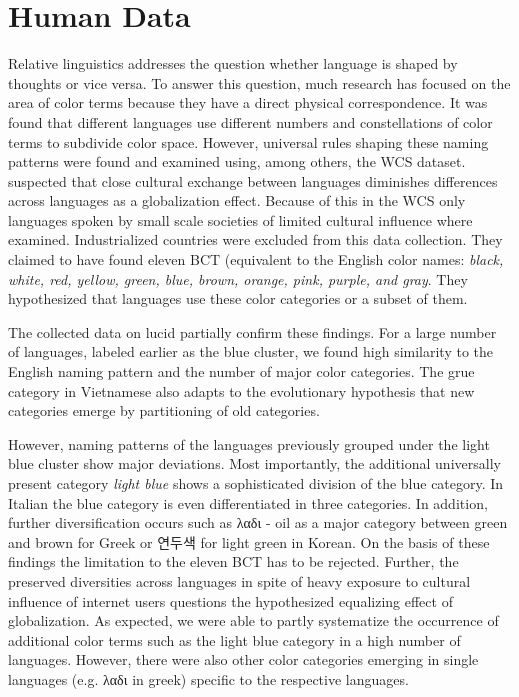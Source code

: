\section{Human Data}
Relative linguistics addresses the question whether language is shaped by thoughts or vice versa. To answer this question, much research has focused on the area of color terms because they have a direct physical correspondence. It was found that different languages use different numbers and constellations of color terms to subdivide color space. However, universal rules shaping these naming patterns were found and examined using, among others, the WCS dataset. \textcite{kayWorld2009} suspected that close cultural exchange between languages diminishes differences across languages as a globalization effect. Because of this in the WCS only languages spoken by small scale societies of limited cultural influence where examined. Industrialized countries were excluded from this data collection. They claimed to have found eleven BCT (equivalent to the English color names: \textit{black, white, red, yellow, green, blue, brown, orange, pink, purple, and gray}. They hypothesized that languages use these color categories or a subset of them. 

The collected data on lucid partially confirm these findings. For a large number of languages, labeled earlier as the blue cluster, we found high similarity to the English naming pattern and the number of major color categories. The grue category in Vietnamese also adapts to the evolutionary hypothesis that new categories emerge by partitioning of old categories. 

However, naming patterns of the languages previously grouped under the light blue cluster show major deviations. Most importantly, the additional universally present category \textit{light blue} shows a sophisticated division of the blue category. In Italian the blue category is even differentiated in three categories.
In addition, further diversification occurs such as \textgreek{λαδι} - oil as a major category between green and brown for Greek or \textkorean{연두색} for light green in Korean.
On the basis of these findings the limitation to the eleven BCT has to be rejected. Further, the preserved diversities across languages in spite of heavy exposure to cultural influence of internet users questions the hypothesized equalizing effect of globalization.
As expected, we were able to partly systematize the occurrence of additional color terms such as the light blue category in a high number of languages.
However, there were also other color categories emerging in single languages (e.g. \textgreek{λαδι} in greek) specific to the respective languages.

